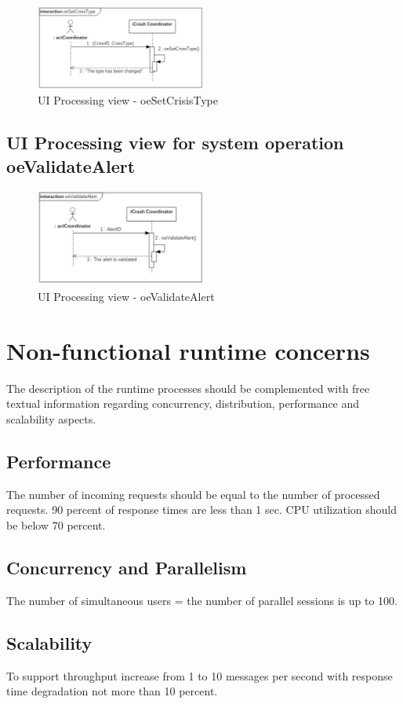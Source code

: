 \begin{figure}[h]
	\centering	
	\captionsetup{justification=centering}
	\includegraphics[width=0.5\textwidth]{./images/ui_oeSetCrisisType.eps}
	\caption{UI Processing view - oeSetCrisisType}
\end{figure}


\subsection{UI Processing view for system operation oeValidateAlert}

\begin{figure}[h]
	\centering	
	\captionsetup{justification=centering}
	\includegraphics[width=0.5\textwidth]{./images/ui_oeValidateAlert.eps}
	\caption{UI Processing view - oeValidateAlert}
\end{figure}



\section{Non-functional runtime concerns}
The description of the runtime processes should be complemented with free
textual information regarding concurrency, distribution, performance and scalability aspects.


\subsection{Performance}
The number of incoming requests should be equal to the number of processed requests.
90 percent of response times are less than 1 sec.
CPU utilization should be below 70 percent.


\subsection{Concurrency and Parallelism}
The number of simultaneous users = the number of parallel sessions is up to 100.





\subsection{Scalability}
To support throughput increase from 1 to 10 messages per second with response
time degradation not more than 10 percent.






